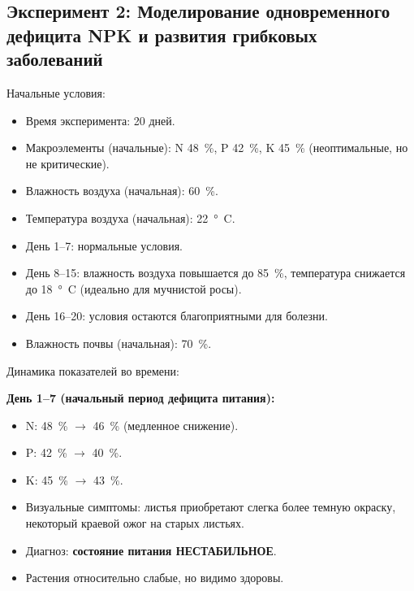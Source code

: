\subsection{Эксперимент 2: Моделирование одновременного дефицита NPK и развития грибковых заболеваний}

Начальные условия:
\begin{itemize}
    \item Время эксперимента: \num{20} дней.
    \item Макроэлементы (начальные): N \SI{48}{\percent}, P \SI{42}{\percent}, K \SI{45}{\percent} (неоптимальные, но не критические).
    \item Влажность воздуха (начальная): \SI{60}{\percent}.
    \item Температура воздуха (начальная): \SI{22}{\degree C}.
    \item День 1--7: нормальные условия.
    \item День 8--15: влажность воздуха повышается до \SI{85}{\percent}, температура снижается до \SI{18}{\degree C} (идеально для мучнистой росы).
    \item День 16--20: условия остаются благоприятными для болезни.
    \item Влажность почвы (начальная): \SI{70}{\percent}.
\end{itemize}

Динамика показателей во времени:

\textbf{День 1--7 (начальный период дефицита питания):}
\begin{itemize}
    \item N: \SI{48}{\percent} $\to$ \SI{46}{\percent} (медленное снижение).
    \item P: \SI{42}{\percent} $\to$ \SI{40}{\percent}.
    \item K: \SI{45}{\percent} $\to$ \SI{43}{\percent}.
    \item Визуальные симптомы: листья приобретают слегка более темную окраску, некоторый краевой ожог на старых листьях.
    \item Диагноз: \textbf{состояние питания НЕСТАБИЛЬНОЕ}.
    \item Растения относительно слабые, но видимо здоровы.
\end{itemize}

